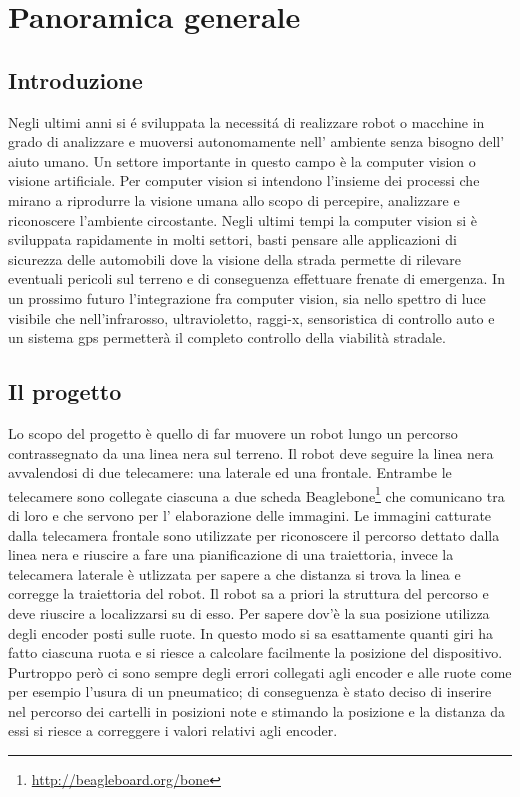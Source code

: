 \chapter{Panoramica generale}

\section{Introduzione}

	Negli ultimi anni si \'e sviluppata la necessit\'a di realizzare robot o macchine in grado di analizzare e muoversi autonomamente nell' ambiente senza bisogno dell' aiuto umano. Un settore importante in questo campo è la computer vision o visione artificiale. Per computer vision si intendono l’insieme dei processi che mirano a riprodurre la visione umana allo scopo di percepire, analizzare e riconoscere l'ambiente circostante. Negli ultimi tempi la computer vision si è sviluppata rapidamente in molti settori, basti pensare alle applicazioni di sicurezza delle automobili dove la visione della strada permette di rilevare eventuali pericoli sul terreno e di conseguenza effettuare frenate di emergenza. In un prossimo futuro l'integrazione fra computer vision, sia nello spettro di luce visibile che nell'infrarosso, ultravioletto, raggi-x, sensoristica di controllo auto e un sistema gps permetterà il completo controllo della viabilità stradale.

\section{Il progetto}

	Lo scopo del progetto è quello di far muovere un robot lungo un percorso contrassegnato da una linea nera sul terreno. Il robot deve seguire la linea nera avvalendosi di due telecamere: una laterale ed una frontale. Entrambe le telecamere sono collegate ciascuna a due scheda Beaglebone\footnote{\url{http://beagleboard.org/bone}} che comunicano tra di loro e che servono per l' elaborazione delle immagini. Le immagini catturate dalla telecamera frontale sono utilizzate per riconoscere il percorso dettato dalla linea nera e riuscire a fare una pianificazione di una traiettoria, invece la telecamera laterale è utlizzata per sapere a che distanza si trova la linea e corregge la traiettoria del robot. Il robot sa a priori la struttura del percorso e deve riuscire a localizzarsi su di esso. Per sapere dov'è la sua posizione utilizza degli encoder posti sulle ruote. In questo modo si sa esattamente quanti giri ha fatto ciascuna ruota e si riesce a calcolare facilmente la posizione del dispositivo. Purtroppo però ci sono sempre degli errori collegati agli encoder e alle ruote come per esempio l'usura di un pneumatico; di conseguenza è stato deciso di inserire nel percorso dei cartelli in posizioni note e stimando la posizione e la distanza da essi si riesce a correggere i valori relativi agli encoder.


